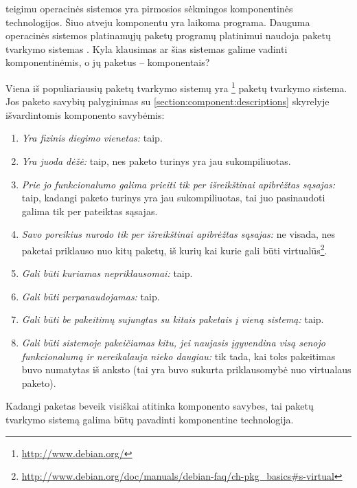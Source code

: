 \cite[12]{cs-beyond-object-oriented-programming} teigimu operacinės
sistemos yra pirmosios sėkmingos komponentinės technologijos. Šiuo
atveju komponentu yra laikoma programa. Dauguma 
operacinės sistemos platinamųjų paketų  programų
platinimui naudoja paketų tvarkymo sistemas . Kyla klausimas ar šias sistemas galime vadinti komponentinėmis,
o jų paketus – komponentais?

Viena iš populiariausių paketų tvarkymo sistemų yra
\footnote{\url{http://www.debian.org/}} paketų
tvarkymo sistema. Jos paketo savybių palyginimas su
\ref{section:component:descriptions} skyrelyje išvardintomis
komponento savybėmis:
\begin{enumerate}
  \item \emph{Yra fizinis diegimo vienetas:} taip.
  \item \emph{Yra juoda dėžė:} taip, nes paketo turinys yra jau
    sukompiliuotas.
  \item \emph{Prie jo funkcionalumo galima prieiti tik per
    išreikštinai apibrėžtas sąsajas:} taip, kadangi paketo turinys
    yra jau sukompiliuotas, tai juo pasinaudoti galima tik per
    pateiktas sąsajas.
  \item \emph{Savo poreikius nurodo tik per išreikštinai apibrėžtas
    sąsajas:} ne visada, nes  paketai priklauso nuo
    kitų paketų, iš kurių kai kurie gali būti virtualūs\footnote{
    \url{http://www.debian.org/doc/manuals/debian-faq/ch-pkg_basics\#s-virtual}}.
  \item \emph{Gali būti kuriamas nepriklausomai:} taip.
  \item \emph{Gali būti perpanaudojamas:} taip.
  \item \emph{Gali būti be pakeitimų sujungtas su kitais paketais
    į vieną sistemą:} taip.
  \item \emph{Gali būti sistemoje pakeičiamas kitu, jei naujasis
    įgyvendina visą senojo funkcionalumą ir nereikalauja nieko
    daugiau:} tik tada, kai toks pakeitimas buvo numatytas iš anksto
    (tai yra buvo sukurta priklausomybė nuo virtualaus paketo).
\end{enumerate}
Kadangi  paketas beveik visiškai atitinka komponento
savybes, tai  paketų tvarkymo sistemą galima
būtų pavadinti komponentine technologija.

